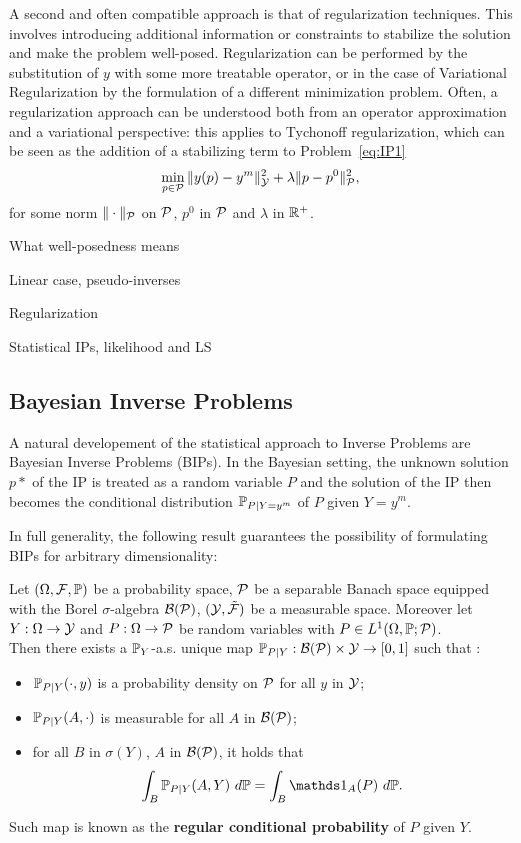 A second and often compatible approach is that of regularization techniques. This involves introducing additional information or constraints to stabilize the solution and make the problem well-posed. Regularization can be performed by the substitution of $y$ with some more treatable operator, or in the case of Variational Regularization by the formulation of a different minimization problem. Often, a regularization approach can be understood both from an operator approximation and a variational perspective: this applies to Tychonoff regularization, which can be seen as the addition of a stabilizing term to Problem~\ref{eq:IP1}
\begin{equation}\label{eq:Tycho}
    \min_{p\in \mathcal P} \| y(p) - y^m \|_\mathcal Y^2 + \lambda\| p - p^0 \|_\mathcal P^2,
\end{equation}
for some norm $\|\cdot\|_\mathcal P$ on $\mathcal P$, $p^0$ in $\mathcal P$ and $\lambda $ in $ \mathbb{R}^+$.

What well-posedness means

Linear case, pseudo-inverses

Regularization

Statistical IPs, likelihood and LS 


\subsection{Bayesian Inverse Problems}\label{sec:BIP}

A natural developement of the statistical approach to Inverse Problems are Bayesian Inverse Problems (BIPs). 
In the Bayesian setting, the unknown solution $p*$ of the IP is treated as a random variable $P$ and the solution of the IP then becomes the conditional distribution $\mathbb P_{P \mid Y=y^m} $ of $P$ given $Y=y^m$.

In full generality, the following result guarantees the possibility of formulating BIPs for arbitrary dimensionality:
\begin{thm}
    Let $ (\Omega, \mathcal F , \mathbb P) $ be a probability space, $\mathcal P$ be a separable Banach space equipped with the Borel $\sigma$-algebra $\mathcal B (\mathcal P)$, $(\mathcal Y, \tilde{\mathcal F})$ be a measurable space.
    Moreover let $Y:\Omega \rightarrow \mathcal Y$ and $P : \Omega \rightarrow \mathcal P$ be random variables with $P \in L^1(\Omega, \mathbb P; \mathcal P) $. \\
    Then there exists a $\mathbb P_Y$-a.s. unique map $\mathbb P_{P \mid Y} : \mathcal B (\mathcal P) \times \mathcal Y \rightarrow [0,1] $ such that :
    \begin{itemize}
        \item $\mathbb P_{P \mid Y}(\cdot, y)$ is a probability density on $\mathcal P$ for all $y$ in $\mathcal Y$;
        \item $\mathbb P_{P \mid Y}(A, \cdot)$ is measurable for all $A$ in $\mathcal B (\mathcal P)$;
        \item for all $B$ in $\sigma(Y)$, $A$ in $\mathcal B (\mathcal P)$, it holds that
                \[ 
                \int_B \bb P_{P \mid Y}(A, Y) \ d\bb P= \int_B \ind_A(P) \ d\bb P .
                \] 
    \end{itemize}
    Such map is known as the \textbf{regular conditional probability} of $P$ given $Y$.
\end{thm}

